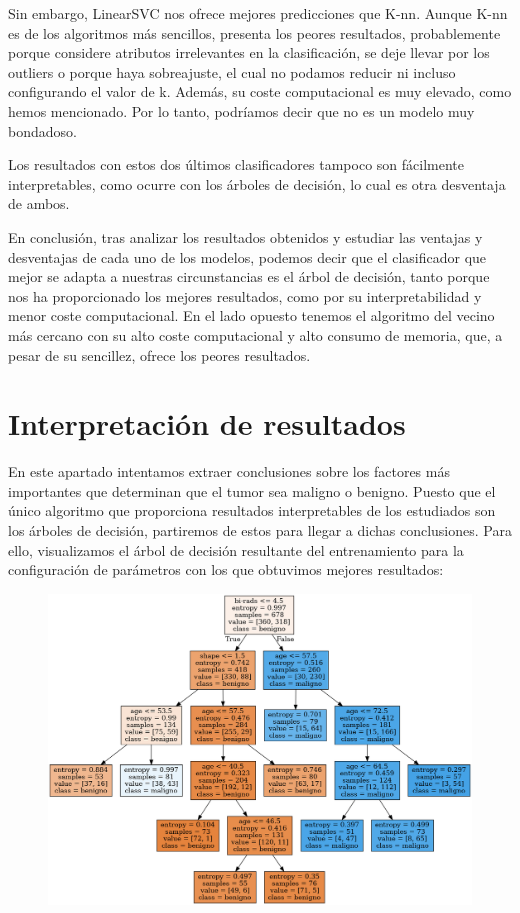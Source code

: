 \documentclass[a4paper,11pt]{article}
\begin{document}
Sin embargo, LinearSVC nos ofrece mejores predicciones que K-nn. Aunque K-nn es de los algoritmos más sencillos, presenta los peores resultados, probablemente porque considere atributos irrelevantes en la clasificación, se deje llevar por los outliers o porque haya sobreajuste, el cual no podamos reducir ni incluso configurando el valor de k. Además, su coste computacional es muy elevado, como hemos mencionado. Por lo tanto, podríamos decir que no es un modelo muy bondadoso. 


Los resultados con estos dos últimos clasificadores tampoco son fácilmente interpretables, como ocurre con los árboles de decisión, lo cual es otra desventaja de ambos. 


En conclusión, tras analizar los resultados obtenidos y estudiar las ventajas y desventajas de cada uno de los modelos, podemos decir que el clasificador que mejor se adapta a nuestras circunstancias es el árbol de decisión, tanto porque nos ha proporcionado los mejores resultados, como por su interpretabilidad y menor coste computacional. En el lado opuesto tenemos el algoritmo del vecino más cercano con su alto coste computacional y alto consumo de memoria, que, a pesar de su sencillez, ofrece los peores resultados.

\newpage
\section{Interpretación de resultados}

En este apartado intentamos extraer conclusiones sobre los factores más importantes que determinan que el tumor sea maligno o benigno. Puesto que el único algoritmo que proporciona resultados interpretables de los estudiados son los árboles de decisión, partiremos de estos para llegar a dichas conclusiones. Para ello, visualizamos el árbol de decisión resultante del entrenamiento para la configuración de parámetros con los que obtuvimos mejores resultados:

\begin{figure}[H]
	\centering
	\includegraphics[width=1.1\linewidth]{img/decision_tree}
	\caption{}
	\label{fig:decisiontree}
\end{figure}
\end{document}
